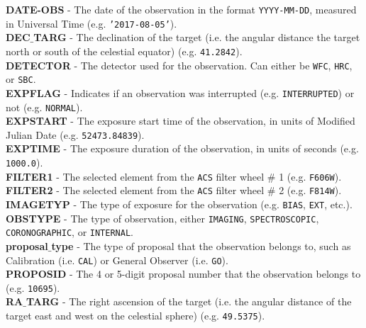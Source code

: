 \documentclass[10pt,journal,compsoc]{IEEEtran}
\begin{document}
\noindent\textbf{DATE-OBS} - The date of the observation in the format \texttt{YYYY-MM-DD}, measured in Universal Time (e.g. \texttt{'2017-08-05'}).\\

\noindent\textbf{DEC$\_$TARG} - The declination of the target (i.e. the angular distance the target north or south of the celestial equator) (e.g. \texttt{41.2842}).\\

\noindent\textbf{DETECTOR} - The detector used for the observation.  Can either be \texttt{WFC}, \texttt{HRC}, or \texttt{SBC}.\\

\noindent\textbf{EXPFLAG} - Indicates if an observation was interrupted (e.g. \texttt{INTERRUPTED}) or not (e.g. \texttt{NORMAL}).\\

\noindent\textbf{EXPSTART} - The exposure start time of the observation, in units of Modified Julian Date (e.g. \texttt{52473.84839}).\\

\noindent\textbf{EXPTIME} - The exposure duration of the observation, in units of seconds (e.g. \texttt{1000.0}).\\

\noindent\textbf{FILTER1} - The selected element from the \texttt{ACS} filter wheel \# 1 (e.g. \texttt{F606W}).\\

\noindent\textbf{FILTER2} - The selected element from the \texttt{ACS} filter wheel \# 2 (e.g. \texttt{F814W}).\\

\noindent\textbf{IMAGETYP} - The type of exposure for the observation (e.g. \texttt{BIAS}, \texttt{EXT}, etc.).\\

\noindent\textbf{OBSTYPE} - The type of observation, either \texttt{IMAGING}, \texttt{SPECTROSCOPIC}, \texttt{CORONOGRAPHIC}, or \texttt{INTERNAL}.\\

\noindent\textbf{proposal$\_$type} - The type of proposal that the observation belongs to, such as Calibration (i.e. \texttt{CAL}) or General Observer (i.e. \texttt{GO}).\\

\noindent\textbf{PROPOSID} - The 4 or 5-digit proposal number that the observation belongs to (e.g. \texttt{10695}).\\

\noindent\textbf{RA$\_$TARG} - The right ascension of the target (i.e. the angular distance of the target east and west on the celestial sphere) (e.g. \texttt{49.5375}).\\
\end{document}
